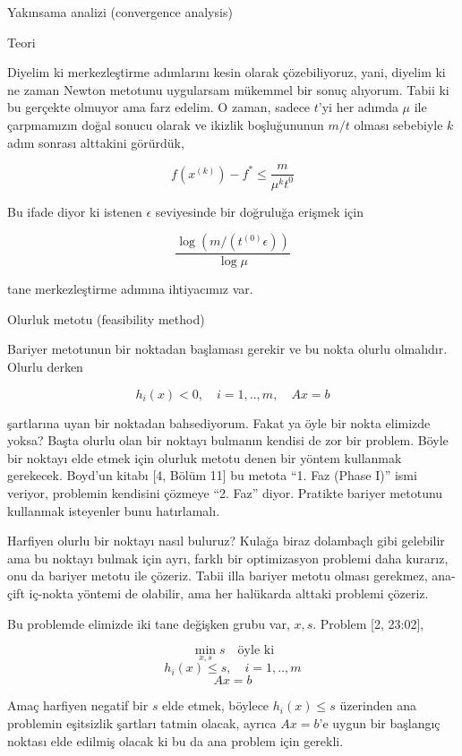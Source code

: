 \documentclass[12pt,fleqn]{article}\usepackage{../../common}
\begin{document}
Yakınsama analizi (convergence analysis) 

Teori 

Diyelim ki merkezleştirme adımlarını kesin olarak çözebiliyoruz, yani,
diyelim ki ne zaman Newton metotunu uygularsam mükemmel bir sonuç
alıyorum. Tabii ki bu gerçekte olmuyor ama farz edelim. O zaman, sadece
$t$'yi her adımda $\mu$ ile çarpmamızın doğal sonucu olarak ve ikizlik
boşluğununun $m / t$ olması sebebiyle $k$ adım sonrası alttakini görürdük, 

$$
f(x^(k)) - f^\ast \le \frac{m}{\mu^k t^{0}}
$$

Bu ifade diyor ki istenen $\epsilon$ seviyesinde bir doğruluğa erişmek için 

$$
\frac{\log ( m / (t^{(0)} \epsilon) )}{\log \mu}
$$

tane merkezleştirme adımına ihtiyacımız var. 

Olurluk metotu (feasibility method)

Bariyer metotunun bir noktadan başlaması gerekir ve bu nokta olurlu
olmalıdır. Olurlu derken 

$$
h_i(x) < 0, \quad i=1,..,m, \quad Ax = b
$$

şartlarına uyan bir noktadan bahsediyorum. Fakat ya öyle bir nokta elimizde
yoksa? Başta olurlu olan bir noktayı bulmanın kendisi de zor bir
problem. Böyle bir noktayı elde etmek için olurluk metotu denen bir yöntem
kullanmak gerekecek. Boyd'un kitabı [4, Bölüm 11] bu metota ``1. Faz (Phase
I)'' ismi veriyor, problemin kendisini çözmeye ``2. Faz'' diyor. Pratikte
bariyer metotunu kullanmak isteyenler bunu hatırlamalı.

Harfiyen olurlu bir noktayı nasıl buluruz? Kulağa biraz dolambaçlı gibi
gelebilir ama bu noktayı bulmak için ayrı, farklı bir optimizasyon problemi
daha kurarız, onu da bariyer metotu ile çözeriz. Tabii illa bariyer metotu
olması gerekmez, ana-çift iç-nokta yöntemi de olabilir, ama her halükarda
alttaki problemi çözeriz. 

Bu problemde elimizde iki tane değişken grubu var, $x,s$. Problem [2, 23:02], 

$$
\min_{x,s} s \quad \textrm{öyle ki}
$$
$$
h_i(x) \le s, \quad i=1,..,m
$$
$$
Ax = b
$$

Amaç harfiyen negatif bir $s$ elde etmek, böylece $h_i(x) \le s$ üzerinden
ana problemin eşitsizlik şartları tatmin olacak, ayrıca $Ax = b$'e uygun
bir başlangıç noktası elde edilmiş olacak ki bu da ana problem için
gerekli. 
\end{document}
